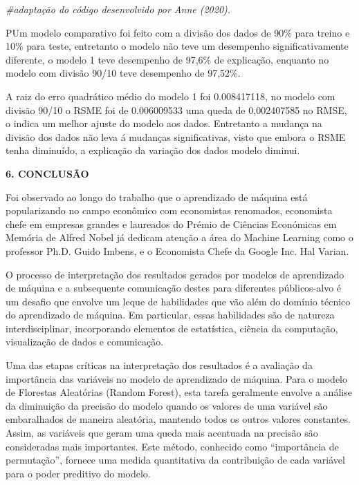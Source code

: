 \documentclass[
]{article}
\newenvironment{Shaded}{\begin{snugshade}}{\end{snugshade}}
\newcommand{\CommentTok}[1]{\textcolor[rgb]{0.56,0.35,0.01}{\textit{#1}}}
\begin{document}
\begin{Shaded}
\begin{Highlighting}[]
\CommentTok{\#adaptação do código desenvolvido por Anne (2020).}
\end{Highlighting}
\end{Shaded}

PUm modelo comparativo foi feito com a divisão dos dados de 90\% para
treino e 10\% para teste, entretanto o modelo não teve um desempenho
significativamente diferente, o modelo 1 teve desempenho de 97,6\% de
explicação, enquanto no modelo com divisão 90/10 teve desempenho de
97,52\%.

A raiz do erro quadrático médio do modelo 1 foi 0.008417118, no modelo
com divisão 90/10 o RSME foi de 0.006009533 uma queda de 0,002407585 no
RMSE, o indica um melhor ajuste do modelo aos dados. Entretanto a
mudança na divisão dos dados não leva á mudanças significativas, visto
que embora o RSME tenha diminuído, a explicação da variação dos dados
modelo diminui.

\textbf{6. CONCLUSÃO}

Foi observado ao longo do trabalho que o aprendizado de máquina está
popularizando no campo econômico com economistas renomados, economista
chefe em empresas grandes e laureados do Prémio de Ciências Económicas
em Memória de Alfred Nobel já dedicam atenção a área do Machine Learning
como o professor Ph.D. Guido Imbens, e o Economista Chefe da Google Inc.
Hal Varian.

O processo de interpretação dos resultados gerados por modelos de
aprendizado de máquina e a subsequente comunicação destes para
diferentes públicos-alvo é um desafio que envolve um leque de
habilidades que vão além do domínio técnico do aprendizado de máquina.
Em particular, essas habilidades são de natureza interdisciplinar,
incorporando elementos de estatística, ciência da computação,
visualização de dados e comunicação.

Uma das etapas críticas na interpretação dos resultados é a avaliação da
importância das variáveis no modelo de aprendizado de máquina. Para o
modelo de Florestas Aleatórias (Random Forest), esta tarefa geralmente
envolve a análise da diminuição da precisão do modelo quando os valores
de uma variável são embaralhados de maneira aleatória, mantendo todos os
outros valores constantes. Assim, as variáveis que geram uma queda mais
acentuada na precisão são consideradas mais importantes. Este método,
conhecido como ``importância de permutação'', fornece uma medida
quantitativa da contribuição de cada variável para o poder preditivo do
modelo.
\end{document}
